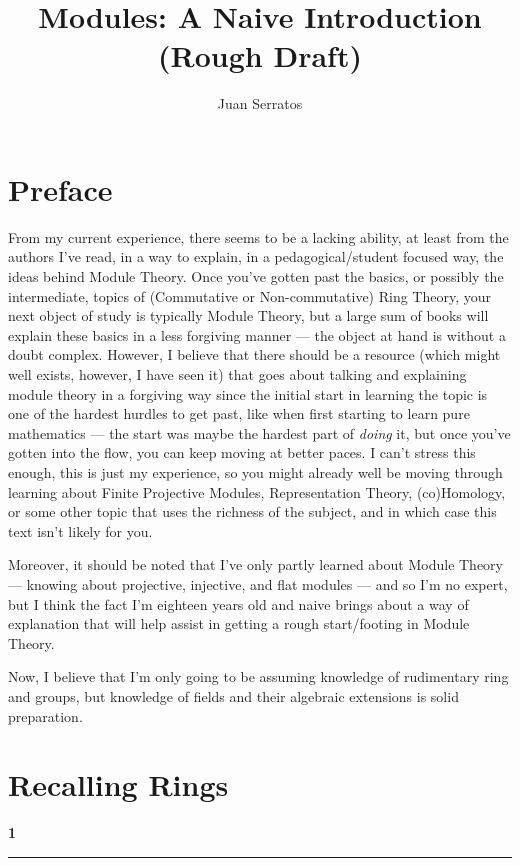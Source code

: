 \documentclass[graybox, reqno]{svmono}
\begin{document}
\title{Modules: A Naive Introduction (Rough Draft)}
\author{Juan Serratos}
\frontmatter
\maketitle
\tableofcontents
\mainmatter 
\chapter*{Preface}

From my current experience, there seems to be a lacking ability, at least from the authors I've read, in a way to explain, in a pedagogical/student focused way, the ideas behind Module Theory. Once you've gotten past the basics, or possibly the intermediate, topics of (Commutative or Non-commutative) Ring Theory, your next object of study is typically Module Theory, but a large sum of books will explain these basics in a less forgiving manner — the object at hand is without a doubt complex. However, I believe that there should be a resource (which might well exists, however, I have seen it) that goes about talking and explaining module theory in a forgiving way since the initial start in learning the topic is one of the hardest hurdles to get past, like when first starting to learn pure mathematics — the start was maybe the hardest part of \textit{doing} it, but once you've gotten into the flow, you can keep moving at better paces. I can't stress this enough, this is just my experience, so you might already well be moving through learning about Finite Projective Modules, Representation Theory, (co)Homology, or some other topic that uses the richness of the subject, and in which case this text isn't likely for you.  

Moreover, it should be noted that I've only partly learned about Module Theory — knowing about projective, injective, and flat modules — and so I'm no expert, but I think the fact I'm eighteen years old and naive brings about a way of explanation that will help assist in getting a rough start/footing in Module Theory.  

Now, I believe that I'm only going to be assuming knowledge of rudimentary ring and groups, but knowledge of fields and their algebraic extensions is solid preparation. 

\chapter{Recalling Rings}
\begin{center}
    \fontsize{20pt}{10pt}
    \textbf{1}
\end{center}
\hrule
\end{document}

